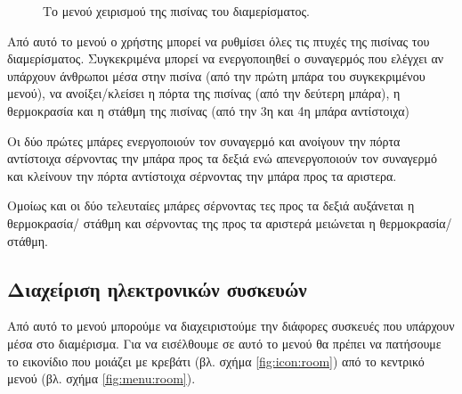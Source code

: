 \documentclass{assignment}
\begin{document}
\begin{figure}
\begin{center}
\caption{Το μενού χειρισμού της πισίνας του διαμερίσματος.}
\label{fig:menu:pool}
\end{center}
\end{figure}

Από αυτό το μενού ο χρήστης μπορεί να ρυθμίσει όλες τις πτυχές της πισίνας του διαμερίσματος. Συγκεκριμένα μπορεί να ενεργοποιηθεί ο συναγερμός που ελέγχει αν υπάρχουν άνθρωποι μέσα στην πισίνα (από την πρώτη μπάρα του συγκεκριμένου μενού), να ανοίξει/κλείσει η πόρτα της πισίνας (από την δεύτερη μπάρα), η θερμοκρασία και η στάθμη της πισίνας (από την 3η και 4η μπάρα αντίστοιχα)

Οι δύο πρώτες μπάρες ενεργοποιούν τον συναγερμό και ανοίγουν την πόρτα αντίστοιχα σέρνοντας την μπάρα προς τα δεξιά ενώ απενεργοποιούν τον συναγερμό και κλείνουν την πόρτα αντίστοιχα σέρνοντας την μπάρα προς τα αριστερα.

Ομοίως και οι δύο τελευταίες μπάρες σέρνοντας τες προς τα δεξιά αυξάνεται η θερμοκρασία/ στάθμη και σέρνοντας της προς τα αριστερά μειώνεται η θερμοκρασία/στάθμη.

\newpage

\subsection{Διαχείριση ηλεκτρονικών συσκευών}
\label{syskeuves}

Από αυτό το μενού μπορούμε να διαχειριστούμε την διάφορες συσκευές που υπάρχουν μέσα στο διαμέρισμα. Για να εισέλθουμε σε αυτό το μενού θα πρέπει να πατήσουμε το εικονίδιο που μοιάζει με κρεβάτι (βλ. σχήμα \ref{fig:icon:room}) από το κεντρικό μενού (βλ. σχήμα \ref{fig:menu:room}).
\end{document}
